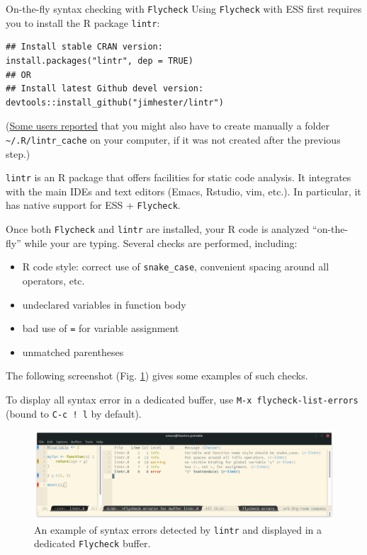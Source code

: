 \documentclass[presentation]{beamer}
\begin{document}
\begin{frame}[fragile,allowframebreaks,label=]{On-the-fly syntax checking with \texttt{Flycheck}}
 Using \texttt{Flycheck} with ESS first requires you to install the R package \texttt{lintr}:

\begin{verbatim}
## Install stable CRAN version:
install.packages("lintr", dep = TRUE)
## OR
## Install latest Github devel version:
devtools::install_github("jimhester/lintr")
\end{verbatim}

(\href{https://emacs.stackexchange.com/questions/53018/flycheck-r-lintr-doesnt-find-anything}{Some users reported} that you might also have to create manually a folder \texttt{\textasciitilde{}/.R/lintr\_cache} on your computer, if it was not created after the previous step.)

\texttt{lintr} is an R package that offers facilities for static code analysis. It integrates with the main IDEs and text editors (Emacs, Rstudio, vim, etc.). In particular, it has native support for ESS + \texttt{Flycheck}.

\pagebreak

Once both \texttt{Flycheck} and \texttt{lintr} are installed, your R code is analyzed ``on-the-fly'' while your are typing. Several checks are performed, including:
\begin{itemize}
\item R code style: correct use of \texttt{snake\_case}, convenient spacing around all operators, etc.
\item undeclared variables in function body
\item bad use of \texttt{=} for variable assignment
\item unmatched parentheses
\end{itemize}

The following screenshot (Fig. \ref{fig:orgfcabaee}) gives some examples of such checks.

To display all syntax error in a dedicated buffer, use \texttt{M-x flycheck-list-errors} (bound to \texttt{C-c ! l} by default).

\pagebreak

\begin{figure}[htbp]
\centering
\includegraphics[width=\textwidth]{./images/lintr.png}
\caption{\label{fig:orgfcabaee}An example of syntax errors detected by \texttt{lintr} and displayed in a dedicated \texttt{Flycheck} buffer.}
\end{figure}
\end{frame}
\end{document}
